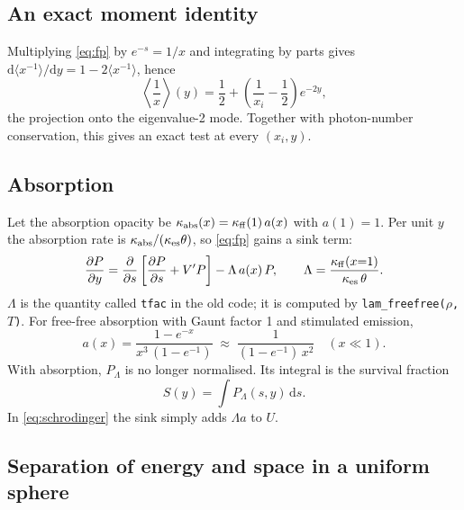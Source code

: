 \documentclass[11pt]{article}
\newcommand{\dd}{\mathrm{d}}
\begin{document}
\subsection{An exact moment identity}

Multiplying \eqref{eq:fp} by $e^{-s}=1/x$ and integrating by parts gives
$\dd\langle x^{-1}\rangle/\dd y = 1-2\langle x^{-1}\rangle$, hence
\begin{equation}\label{eq:identity}
  \left\langle \frac1x\right\rangle(y)
  = \frac12 + \left(\frac1{x_i}-\frac12\right)e^{-2y},
\end{equation}
the projection onto the eigenvalue-2 mode. Together with photon-number
conservation, this gives an exact test at every $(x_i,y)$.

\subsection{Absorption}\label{sec:absorption}

Let the absorption opacity be $\kappa_{\rm abs}(x)=\kappa_{\rm ff}(1)\,a(x)$
with $a(1)=1$. Per unit $y$ the absorption rate is
$\kappa_{\rm abs}/(\kappa_{\rm es}\theta)$, so \eqref{eq:fp} gains a sink
term:
\begin{equation}\label{eq:fpabs}
  \frac{\partial P}{\partial y} = \frac{\partial}{\partial s}
  \left[\frac{\partial P}{\partial s} + V' P\right] - \Lambda\,a(x)\,P,
  \qquad
  \Lambda = \frac{\kappa_{\rm ff}(x{=}1)}{\kappa_{\rm es}\,\theta}.
\end{equation}
$\Lambda$ is the quantity called \texttt{tfac} in the old code; it is
computed by \texttt{lam\_freefree($\rho$,$T$)}. For free-free absorption
with Gaunt factor 1 and stimulated emission,
\begin{equation}
  a(x) = \frac{1-e^{-x}}{x^3\,(1-e^{-1})} \;\approx\; \frac{1}{(1-e^{-1})\,x^2}
  \quad (x\ll1).
\end{equation}
With absorption, $P_\Lambda$ is no longer normalised. Its integral is the
survival fraction
\begin{equation}
  S(y) = \int P_\Lambda(s,y)\,\dd s .
\end{equation}
In \eqref{eq:schrodinger} the sink simply adds $\Lambda a$ to $U$.

\subsection{Separation of energy and space in a uniform sphere}\label{sec:separation}
\end{document}
